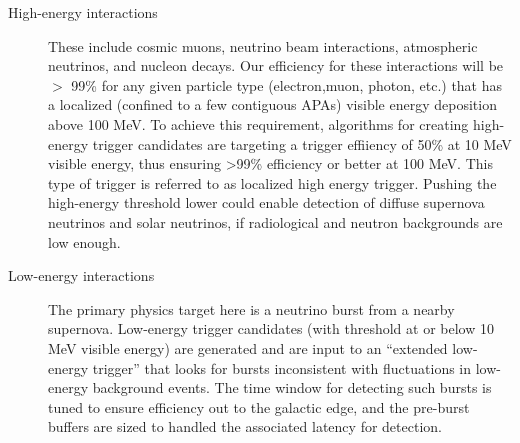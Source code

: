 \begin{description}
\item[High-energy interactions] These include cosmic muons, neutrino beam interactions, atmospheric neutrinos, and nucleon decays. 
  Our efficiency for these interactions will be $>$ 99\% for any given particle type (electron,muon, photon, etc.) that has a localized (confined to a few contiguous APAs) visible energy deposition above 100 MeV.
  To achieve this requirement, algorithms for creating high-energy trigger candidates are targeting a trigger effiiency of 50\% at 10 MeV visible energy, thus ensuring >99\% efficiency or better at 100 MeV.
  This type of trigger is referred to as localized high energy trigger. 
  Pushing the high-energy threshold lower could enable detection of diffuse supernova neutrinos and solar neutrinos, if radiological and neutron backgrounds are low enough.

\item[Low-energy interactions] The primary physics target here is a neutrino burst from a nearby supernova. 
  Low-energy trigger candidates (with threshold at or below 10 MeV visible energy) are generated and are input to an ``extended low-energy trigger'' that looks for bursts inconsistent with fluctuations in low-energy background events. 
  The time window for detecting such bursts is tuned to ensure efficiency out to the galactic edge, and the pre-burst buffers are sized to handled the associated latency for detection.

\end{description}



